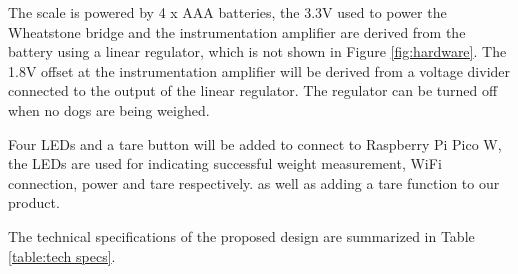 The scale is powered by 4 x AAA batteries, the 3.3V used to power the Wheatstone bridge and the instrumentation amplifier are derived from the battery using a linear regulator, which is not shown in Figure \ref{fig:hardware}. The 1.8V offset at the instrumentation amplifier will be derived from a voltage divider connected to the output of the linear regulator. The regulator can be turned off when no dogs are being weighed.

Four LEDs and a tare button will be added to connect to Raspberry Pi Pico W, the LEDs are used for indicating successful weight measurement, WiFi connection, power and tare respectively. as well as adding a tare function to our product.

The technical specifications of the proposed design are summarized in Table \ref{table:tech specs}.

